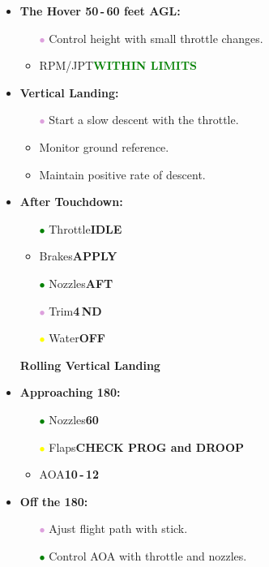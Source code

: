 \documentclass[a4paper,12pt,dvipsnames]{letter}
\newcommand{\button}[1]{\textbf{#1}}
\newcommand{\Deg}{\textdegree{}}
\newcommand{\ok}[1]{\textcolor{Green}{\textbf{#1}}}
\newcommand{\gi}{\textcolor{Green}{$\bullet$\;}}
\newcommand{\yi}{\textcolor{Yellow}{$\bullet$\;}}
\newcommand{\vi}{\textcolor{Plum}{$\bullet$\;}}
\begin{document}
{\begin{itemize}
\begin{itemize}
\end{itemize}
\item \button{The Hover 50\,-\,60 feet AGL:}
\begin{itemize}
 \item[\vi] Control height with small throttle changes.
 \item RPM/JPT\dotfill\ok{WITHIN LIMITS}
\end{itemize}
\item \button{Vertical Landing:}
\begin{itemize}
 \item[\vi] Start a slow descent with the throttle.
 \item Monitor ground reference.
 \item Maintain positive rate of descent.
\end{itemize}
\item \button{After Touchdown:}
\begin{itemize}
\item[\gi] Throttle\dotfill\button{IDLE}
\item Brakes\dotfill\button{APPLY}
\item[\gi] Nozzles\dotfill\button{AFT}
\item[\vi] Trim\dotfill\button{4\Deg\,ND}
\item[\yi] Water\dotfill\button{OFF}
\end{itemize}
\end{itemize}
\newpage
\begin{itemize}
\item[] {\LARGE\textbf{Rolling Vertical Landing}}
\item \button{Approaching 180:}
\begin{itemize}
 \item[\gi] Nozzles\dotfill\button{60\Deg}
 \item[\yi] Flaps\dotfill\button{CHECK PROG and DROOP}
 \item AOA\dotfill\button{10\Deg\,-\,12\Deg}
\end{itemize}
\item \button{Off the 180:}
\begin{itemize}
 \item[\vi] Ajust flight path with stick.
 \item[\gi] Control AOA with throttle and nozzles.

\end{itemize}
\end{itemize}}
\end{document}
